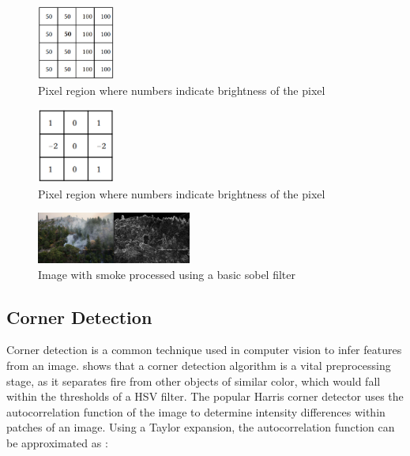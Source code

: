 \documentclass[lettersize,journal]{IEEEtran}
\begin{document}
\begin{figure}
        \centering
        \includegraphics[width=1in]{sobel_pixels.png}
        \caption{Pixel region where numbers indicate brightness of the pixel}
        \label{pixregion}
\end{figure}

\begin{figure}
        \centering
        \includegraphics[width=1in]{gradient_filter.png}
        \caption{Pixel region where numbers indicate brightness of the pixel}
        \label{gradfilter}
\end{figure}

\begin{figure}
        \centering
        \includegraphics[width=2in]{sobelsmoke.png}
        \caption{Image with smoke processed using a basic sobel filter}
        \label{sobelimg}
\end{figure}

\subsection{Corner Detection}

Corner detection is a common technique used in computer vision to infer
features from an image. \cite{prepfire} shows that a corner detection
algorithm is a vital preprocessing stage, as it separates fire from
other objects of similar color, which would fall within the thresholds
of a HSV filter. The popular Harris corner detector uses the
autocorrelation function of the image to determine intensity differences
within patches of an image. Using a Taylor expansion, the
autocorrelation function can be approximated as
\cite{prepfire}\cite{harriscorner}:
\end{document}
